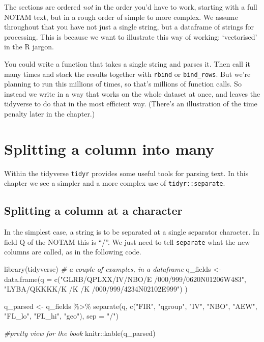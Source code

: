 \documentclass[
]{book}
\newenvironment{Shaded}{\begin{snugshade}}{\end{snugshade}}
\newcommand{\AttributeTok}[1]{\textcolor[rgb]{0.77,0.63,0.00}{#1}}
\newcommand{\CommentTok}[1]{\textcolor[rgb]{0.56,0.35,0.01}{\textit{#1}}}
\newcommand{\FunctionTok}[1]{\textcolor[rgb]{0.00,0.00,0.00}{#1}}
\newcommand{\NormalTok}[1]{#1}
\newcommand{\OtherTok}[1]{\textcolor[rgb]{0.56,0.35,0.01}{#1}}
\newcommand{\SpecialCharTok}[1]{\textcolor[rgb]{0.00,0.00,0.00}{#1}}
\newcommand{\StringTok}[1]{\textcolor[rgb]{0.31,0.60,0.02}{#1}}
\begin{document}
The sections are ordered \emph{not} in the order you'd have to work, starting with a full NOTAM text, but in a rough order of simple to more complex. We assume throughout that you have not just a single string, but a dataframe of strings for processing. This is because we want to illustrate this way of working: `vectorised' in the R jargon.

You could write a function that takes a single string and parses it. Then call it many times and stack the results together with \texttt{rbind} or \texttt{bind\_rows}. But we're planning to run this millions of times, so that's millions of function calls. So instead we write in a way that works on the whole dataset at once, and leaves the tidyverse to do that in the most efficient way. (There's an illustration of the time penalty later in the chapter.)

\hypertarget{splitting-a-column-into-many}{%
\section{Splitting a column into many}\label{splitting-a-column-into-many}}

Within the tidyverse \texttt{tidyr} provides some useful tools for parsing text. In this chapter we see a simpler and a more complex use of \texttt{tidyr::separate}.

\hypertarget{splitatcharacter}{%
\subsection{Splitting a column at a character}\label{splitatcharacter}}

In the simplest case, a string is to be separated at a single separator character. In field Q of the NOTAM this is ``/''. We just need to tell \texttt{separate} what the new columns are called, as in the following code.

\begin{Shaded}
\begin{Highlighting}[]
\FunctionTok{library}\NormalTok{(tidyverse)}
\CommentTok{\# a couple of examples, in a dataframe}
\NormalTok{q\_fields }\OtherTok{\textless{}{-}} \FunctionTok{data.frame}\NormalTok{(}\AttributeTok{q =} \FunctionTok{c}\NormalTok{(}\StringTok{"GLRB/QPLXX/IV/NBO/E /000/999/0620N01206W483"}\NormalTok{, }\StringTok{"LYBA/QKKKK/K /K  /K /000/999/4234N02102E999"}\NormalTok{) )}

\NormalTok{q\_parsed }\OtherTok{\textless{}{-}}\NormalTok{ q\_fields }\SpecialCharTok{\%\textgreater{}\%} 
  \FunctionTok{separate}\NormalTok{(q,}
            \FunctionTok{c}\NormalTok{(}\StringTok{"FIR"}\NormalTok{, }\StringTok{"qgroup"}\NormalTok{, }\StringTok{"IV"}\NormalTok{, }\StringTok{"NBO"}\NormalTok{, }\StringTok{"AEW"}\NormalTok{, }\StringTok{"FL\_lo"}\NormalTok{, }\StringTok{"FL\_hi"}\NormalTok{, }\StringTok{"geo"}\NormalTok{),}
            \AttributeTok{sep =} \StringTok{"/"}\NormalTok{)}

\CommentTok{\#pretty view for the book}
\NormalTok{knitr}\SpecialCharTok{::}\FunctionTok{kable}\NormalTok{(q\_parsed)}
\end{Highlighting}
\end{Shaded}
\end{document}
